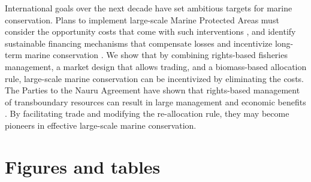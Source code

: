 \documentclass[12pt]{article}
\begin{document}
International goals over the next decade have set ambitious targets for marine conservation. Plans to implement large-scale Marine Protected Areas must consider the opportunity costs that come with such interventions \cite{smith_2010}, and identify sustainable financing mechanisms that compensate losses and incentivize long-term marine conservation \cite{mallin_2019}. We show that by combining rights-based fisheries management, a market design that allows trading, and a biomass-based allocation rule, large-scale marine conservation can be incentivized by eliminating the costs. The Parties to the Nauru Agreement have shown that rights-based management of transboundary resources can result in large management and economic benefits \cite{havice_2013,aqorau_2018}. By facilitating trade and modifying the re-allocation rule, they may become pioneers in effective large-scale marine conservation.





\clearpage

\FloatBarrier

\section*{Figures and tables}
\end{document}

